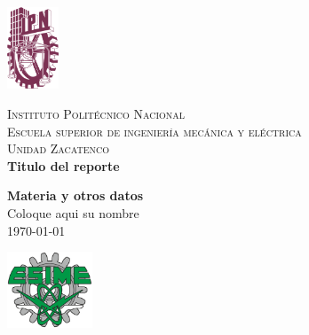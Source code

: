 \documentclass[12pt]{article}
\begin{document}
\colorbox{white!10!}{
    \begin{minipage}[t]{0.150 \textwidth}
       \begin{flushright}
        \includegraphics[width=0.6in]{ipn-national-polytechnic-institute-logo}
       \end{flushright}
    \end{minipage}
    \begin{minipage}[H]{0.62 \textwidth}
        \begin{center}
            {\large \textsc{Instituto Politécnico Nacional
            \\Escuela superior de ingeniería mecánica y eléctrica\\
            Unidad Zacatenco}}
            \vspace{0.25cm}
            \\
            { \large \textbf{Titulo del reporte}}
            \\
            \vspace{0.25cm}
            
            \textbf{Materia y otros datos}
            \vspace{0.10cm}
            \\
            Coloque aqui su nombre
            \\
            \today 
        \end{center}
        \vspace{0.05cm}
    \end{minipage}
    \begin{minipage}[t]{0.150 \textwidth}
        \begin{flushleft}
            \includegraphics[width=1in]{esime-logo.png}
        \end{flushleft}
    \end{minipage}
}
\end{document}
